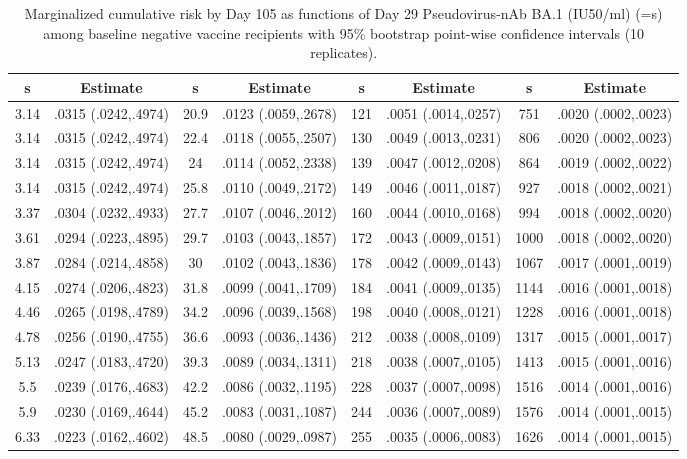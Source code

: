 \begin{longtable}{cccccccc}
\caption{Marginalized cumulative risk by Day 105 as functions of Day 29 Pseudovirus-nAb BA.1 (IU50/ml) (=s) among baseline negative vaccine recipients with 95\% bootstrap point-wise confidence intervals (10 replicates).} \\ 
   \hline  s& Estimate& s& Estimate& s& Estimate& s& Estimate\\ 
\hline
3.14 & .0315 (.0242,.4974) & 20.9 & .0123 (.0059,.2678) & 121 & .0051 (.0014,.0257) & 751 & .0020 (.0002,.0023) \\ 
  3.14 & .0315 (.0242,.4974) & 22.4 & .0118 (.0055,.2507) & 130 & .0049 (.0013,.0231) & 806 & .0020 (.0002,.0023) \\ 
  3.14 & .0315 (.0242,.4974) & 24 & .0114 (.0052,.2338) & 139 & .0047 (.0012,.0208) & 864 & .0019 (.0002,.0022) \\ 
  3.14 & .0315 (.0242,.4974) & 25.8 & .0110 (.0049,.2172) & 149 & .0046 (.0011,.0187) & 927 & .0018 (.0002,.0021) \\ 
  3.37 & .0304 (.0232,.4933) & 27.7 & .0107 (.0046,.2012) & 160 & .0044 (.0010,.0168) & 994 & .0018 (.0002,.0020) \\ 
  3.61 & .0294 (.0223,.4895) & 29.7 & .0103 (.0043,.1857) & 172 & .0043 (.0009,.0151) & 1000 & .0018 (.0002,.0020) \\ 
  3.87 & .0284 (.0214,.4858) & 30 & .0102 (.0043,.1836) & 178 & .0042 (.0009,.0143) & 1067 & .0017 (.0001,.0019) \\ 
  4.15 & .0274 (.0206,.4823) & 31.8 & .0099 (.0041,.1709) & 184 & .0041 (.0009,.0135) & 1144 & .0016 (.0001,.0018) \\ 
  4.46 & .0265 (.0198,.4789) & 34.2 & .0096 (.0039,.1568) & 198 & .0040 (.0008,.0121) & 1228 & .0016 (.0001,.0018) \\ 
  4.78 & .0256 (.0190,.4755) & 36.6 & .0093 (.0036,.1436) & 212 & .0038 (.0008,.0109) & 1317 & .0015 (.0001,.0017) \\ 
  5.13 & .0247 (.0183,.4720) & 39.3 & .0089 (.0034,.1311) & 218 & .0038 (.0007,.0105) & 1413 & .0015 (.0001,.0016) \\ 
  5.5 & .0239 (.0176,.4683) & 42.2 & .0086 (.0032,.1195) & 228 & .0037 (.0007,.0098) & 1516 & .0014 (.0001,.0016) \\ 
  5.9 & .0230 (.0169,.4644) & 45.2 & .0083 (.0031,.1087) & 244 & .0036 (.0007,.0089) & 1576 & .0014 (.0001,.0015) \\ 
  6.33 & .0223 (.0162,.4602) & 48.5 & .0080 (.0029,.0987) & 255 & .0035 (.0006,.0083) & 1626 & .0014 (.0001,.0015) \\ 

\end{longtable}
